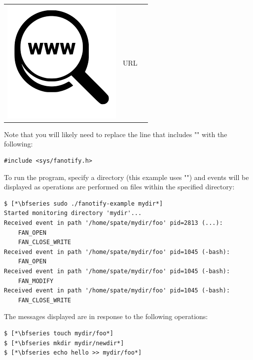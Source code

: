 \begin{table}[h]
\begin{tabular}{lcl}
\parbox[r]{0.5in}{\includegraphics[scale=0.15]{figures/url.png}} & \parbox[l]{0.55in}{URL } & \parbox[l]{3in}{}
\end{tabular}
\end{table}

\noindent
Note that you will likely need to replace the line that includes "" with the following:

\begin{lstlisting}
#include <sys/fanotify.h>
\end{lstlisting}

\noindent
To run the program, specify a directory (this example uses "") and events will be displayed as operations are performed on files within the specified directory:

\begin{lstlisting}
$ [*\bfseries sudo ./fanotify-example mydir*]
Started monitoring directory 'mydir'...
Received event in path '/home/spate/mydir/foo' pid=2813 (...): 
	FAN_OPEN
	FAN_CLOSE_WRITE
Received event in path '/home/spate/mydir/foo' pid=1045 (-bash): 
	FAN_OPEN
Received event in path '/home/spate/mydir/foo' pid=1045 (-bash): 
	FAN_MODIFY
Received event in path '/home/spate/mydir/foo' pid=1045 (-bash): 
	FAN_CLOSE_WRITE
\end{lstlisting}

\noindent
The messages displayed are in response to the following operations:

\begin{lstlisting}
$ [*\bfseries touch mydir/foo*]
$ [*\bfseries mkdir mydir/newdir*]
$ [*\bfseries echo hello >> mydir/foo*]
\end{lstlisting}

